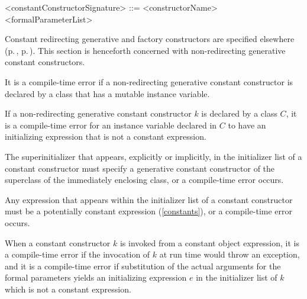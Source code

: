 \documentclass[makeidx]{article}
\begin{document}
\begin{grammar}
<constantConstructorSignature> ::= \gnewline{}
  \CONST{} <constructorName> <formalParameterList>
\end{grammar}


\LMHash{}%
Constant redirecting generative and factory constructors are specified elsewhere
(p.\,\pageref{redirectingGenerativeConstructors},
p.\,\pageref{redirectingFactoryConstructors}).
This section is henceforth concerned with
non-redirecting generative constant constructors.

\LMHash{}%
It is a compile-time error if a non-redirecting generative constant constructor
is declared by a class that has a mutable instance variable.


\LMHash{}%
If a non-redirecting generative constant constructor $k$
is declared by a class $C$,
it is a compile-time error
for an instance variable declared in $C$
to have an initializing expression that is not a constant expression.


\LMHash{}%
The superinitializer that appears, explicitly or implicitly,
in the initializer list of a constant constructor
must specify a generative constant constructor of
the superclass of the immediately enclosing class,
or a compile-time error occurs.

\LMHash{}%
Any expression that appears within
the initializer list of a constant constructor
must be a potentially constant expression
(\ref{constants}),
or a compile-time error occurs.

\LMHash{}%
When a constant constructor $k$ is invoked from a constant object expression,
it is a compile-time error if
the invocation of $k$ at run time would throw an exception,
and it is a compile-time error if
substitution of the actual arguments for the formal parameters
yields an initializing expression $e$ in the initializer list of $k$
which is not a constant expression.
\end{document}

